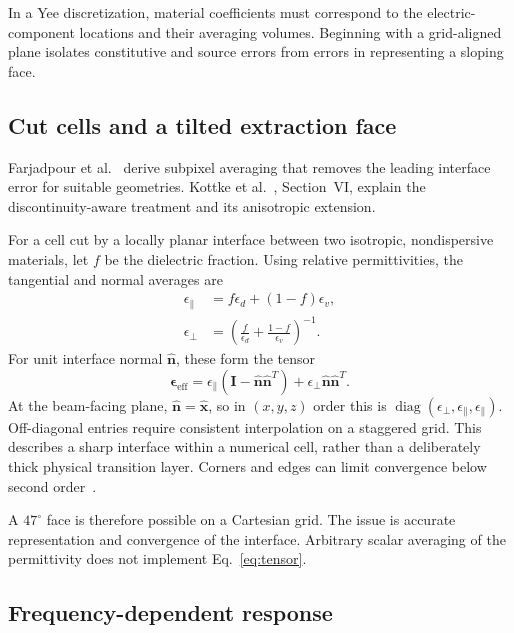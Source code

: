 \documentclass[11pt,a4paper]{article}
\numberwithin{equation}{section}
\begin{document}
In a Yee discretization, material coefficients must correspond to the
electric-component locations and their averaging volumes. Beginning with a
grid-aligned plane isolates constitutive and source errors from errors
in representing a sloping face.

\subsection{Cut cells and a tilted extraction face}

Farjadpour et al.~\cite{farjadpour2006subpixel} derive subpixel averaging
that removes the leading interface error for suitable geometries.
Kottke et al.~\cite{kottke2008interfaces}, Section~VI, explain the
discontinuity-aware treatment and its anisotropic extension.

For a cell cut by a locally planar interface between two isotropic,
nondispersive materials, let \(f\) be the dielectric fraction.
Using relative permittivities, the tangential and normal averages are
\begin{align}
 \epsilon_{\parallel}&=f\epsilon_d+(1-f)\epsilon_v,\\
 \epsilon_{\perp}&=\left(
    \frac{f}{\epsilon_d}+\frac{1-f}{\epsilon_v}
    \right)^{-1}.
\end{align}
For unit interface normal \(\hat{\mathbf n}\), these form the tensor
\begin{equation}
 \boldsymbol{\epsilon}_{\mathrm{eff}}
 =\epsilon_{\parallel}
   (\mathbf I-\hat{\mathbf n}\hat{\mathbf n}^{T})
 +\epsilon_{\perp}\hat{\mathbf n}\hat{\mathbf n}^{T}.
 \label{eq:tensor}
\end{equation}
At the beam-facing plane, \(\hat{\mathbf n}=\hat{\mathbf x}\), so in
\((x,y,z)\) order this is
\(\operatorname{diag}(\epsilon_{\perp},\epsilon_{\parallel},\epsilon_{\parallel})\).
Off-diagonal entries require consistent interpolation on a staggered
grid. This describes a sharp interface within a numerical cell, rather
than a deliberately thick physical transition layer. Corners and edges
can limit convergence below second order~\cite{kottke2008interfaces}.

A \(47^\circ\) face is therefore possible on a Cartesian grid.
The issue is accurate representation and convergence of the interface.
Arbitrary scalar averaging of the permittivity does not implement
Eq.~\eqref{eq:tensor}.

\subsection{Frequency-dependent response}
\end{document}
